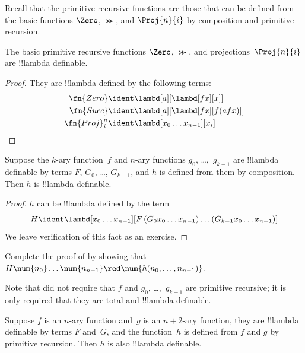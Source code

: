 \documentclass[../../../include/open-logic-section]{subfiles}
\begin{document}

Recall that the primitive recursive functions are those that can be
defined from the basic functions $\Zero$, $\Succ$, and $\Proj{n}{i}$
by composition and primitive recursion.

\begin{lem}
  The basic primitive recursive functions $\Zero$, $\Succ$, and
  projections~$\Proj{n}{i}$ are !!{lambda definable}.
\end{lem}

\begin{proof}
They are !!{lambda define}d by the following terms:
\begin{align*}
  \fn{Zero} & \ident \lambd[a][\lambd[fx][x]]\\
  \fn{Succ} & \ident \lambd[a][\lambd[fx][f (a f x)]] \\
  \fn{Proj}^n_i & \ident \lambd[x_0\dots x_{n-1}][x_i]
\end{align*}
\end{proof}

\begin{lem}
   Suppose the $k$-ary function~$f$ and $n$-ary
  functions $g_0$, \dots,~$g_{k-1}$ are !!{lambda definable} by terms
  $F$, $G_0$, \dots, $G_{k-1}$, and $h$ is defined from them by
  composition. Then $h$ is !!{lambda definable}.
\end{lem}

\begin{proof}
  $h$ can be !!{lambda define}d by the term
  \[
  H \ident \lambd[x_0 \dots x_{n-1}][F\, (G_0 x_0 \dots
    x_{n-1}) \dots (G_{k-1} x_0 \dots x_{n-1})]
  \]
  We leave verification of this fact as an exercise.
\end{proof}

\begin{prob}
  Complete the proof of  by showing
  that $H\num{n_0}\dots\num{n_{n-1}} \red \num{h(n_0, \dots,
    n_{n-1})}$.
\end{prob}

Note that  did not require that $f$ and $g_0$,
\dots,~$g_{k-1}$ are primitive recursive; it is only required that
they are total and !!{lambda definable}.

\begin{lem}
  Suppose $f$ is an $n$-ary function and~$g$ is an $n+2$-ary function,
  they are !!{lambda definable} by terms $F$ and~$G$, and the
  function~$h$ is defined from $f$ and $g$ by primitive
  recursion. Then $h$ is also !!{lambda definable}.
\end{lem}
\end{document}
